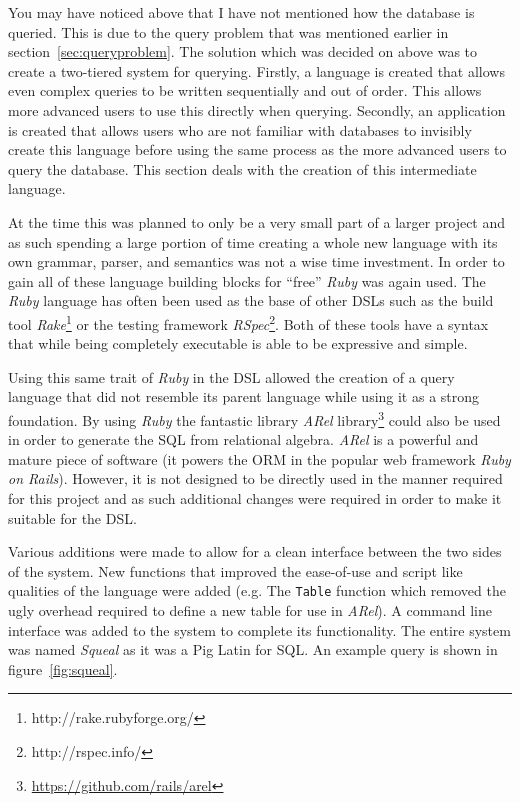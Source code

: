 You may have noticed above that I have not mentioned how the database is
queried. This is due to the query problem that was mentioned earlier in
section~\ref{sec:queryproblem}. The solution which was decided on above was to
create a two-tiered system for querying. Firstly, a language is created that
allows even complex queries to be written sequentially and out of order. This
allows more advanced users to use this directly when querying. Secondly, an
application is created that allows users who are not familiar with databases to
invisibly create this language before using the same process as the more
advanced users to query the database. This section deals with the creation of
this intermediate language.

At the time this was planned to only be a very small part of a larger project
and as such spending a large portion of time creating a whole new language with
its own grammar, parser, and semantics was not a wise time investment. In order
to gain all of these language building blocks for ``free'' \emph{Ruby} was
again used. The \emph{Ruby} language has often been used as the base of other
\acp{DSL} such as the build tool
\emph{Rake}\footnote{http://rake.rubyforge.org/} or the testing framework
\emph{RSpec}\footnote{http://rspec.info/}. Both of these tools have a syntax
that while being completely executable is able to be expressive and simple.

Using this same trait of \emph{Ruby} in the \ac{DSL} allowed the creation of
a query language that did not resemble its parent language while using it as
a strong foundation. By using \emph{Ruby} the fantastic library \emph{ARel}
library\footnote{\url{https://github.com/rails/arel}} could also be used in
order to generate the \ac{SQL} from relational algebra. \emph{ARel} is
a powerful and mature piece of software (it powers the \ac{ORM} in the popular
web framework \emph{Ruby on Rails}). However, it is not designed to be directly
used in the manner required for this project and as such additional changes
were required in order to make it suitable for the \ac{DSL}.

Various additions were made to allow for a clean interface between the two
sides of the system. New functions that improved the ease-of-use and script
like qualities of the language were added (e.g. The \texttt{Table} function
which removed the ugly overhead required to define a new table for use in
\emph{ARel}). A command line interface was added to the system to complete its
functionality. The entire system was named \emph{Squeal} as it was a Pig Latin
for \ac{SQL}. An example query is shown in figure~\ref{fig:squeal}.

